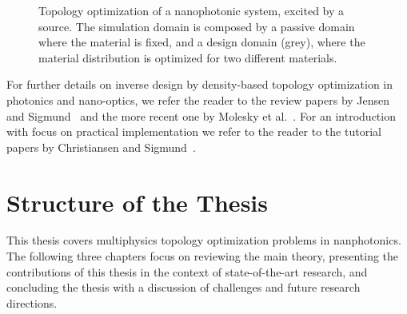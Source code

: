 \begin{figure}[tb]
    \centering
    \caption{Topology optimization of a nanophotonic system, excited by a source. The simulation domain is composed by a passive domain where the material is fixed, and a design domain (grey), where the material distribution is optimized for two different materials.}
        \label{fig:top_opt}
\end{figure}

For further details on inverse design by density-based topology optimization in photonics and nano-optics, we refer the reader to
the review papers by Jensen and Sigmund~\cite{jensen_review} and the more recent one by Molesky et al.~\cite{Molesky_2018}. 
For an introduction with focus on
 practical implementation we refer to the reader to the tutorial papers 
by Christiansen and Sigmund~\cite{tutorial_matlab, tutorial_COMSOL}.  

\section{Structure of the Thesis}

This thesis covers multiphysics topology optimization problems in nanphotonics. The following three chapters focus on reviewing the main theory, presenting 
the contributions of this thesis in the context of state-of-the-art research, and concluding the thesis with a discussion of challenges and future research
directions.

